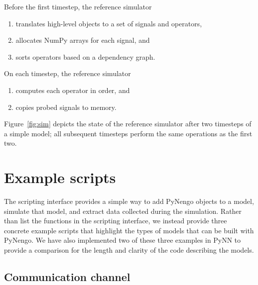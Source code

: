\documentclass{frontiersSCNS}
\begin{document}
Before the first timestep, the reference simulator
\begin{enumerate}
  \item translates high-level objects to
    a set of signals and operators,
  \item allocates NumPy arrays for each signal, and
  \item sorts operators based on a dependency graph.
\end{enumerate}
On each timestep, the reference simulator
\begin{enumerate}
  \item computes each operator in order, and
  \item copies probed signals to memory.
\end{enumerate}
Figure~\ref{fig:sim} depicts
the state of the reference simulator
after two timesteps of a simple model;
all subsequent timesteps perform the same
operations as the first two.

\section{Example scripts} \label{sec:examples}

The scripting interface provides
a simple way to add PyNengo objects to a model,
simulate that model,
and extract data collected during the simulation.
Rather than list the functions in the scripting interface,
we instead provide three concrete example scripts
that highlight the types of models that can be
built with PyNengo.
We have also implemented two of these three examples
in PyNN to provide a comparison
for the length and clarity of the code
describing the models.

\subsection{Communication channel} \label{sec:comm-channel}
\end{document}
